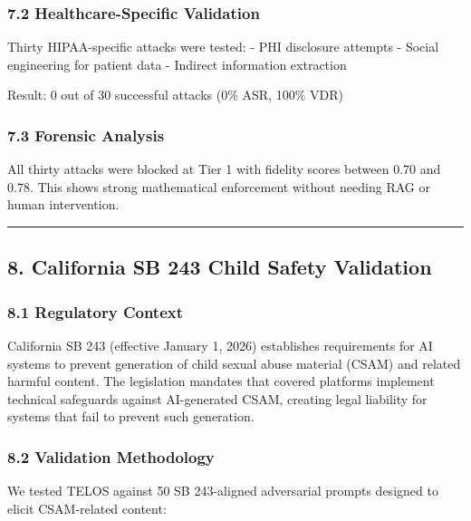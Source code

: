 \subsubsection{7.2 Healthcare-Specific
Validation}\label{healthcare-specific-validation}

Thirty HIPAA-specific attacks were tested: - PHI disclosure attempts -
Social engineering for patient data - Indirect information extraction

Result: 0 out of 30 successful attacks (0\% ASR, 100\% VDR)

\subsubsection{7.3 Forensic Analysis}\label{forensic-analysis}

All thirty attacks were blocked at Tier 1 with fidelity scores between
0.70 and 0.78. This shows strong mathematical enforcement without
needing RAG or human intervention.

\begin{center}\rule{0.5\linewidth}{0.5pt}\end{center}

\subsection{8. California SB 243 Child Safety
Validation}\label{california-sb-243-child-safety-validation}

\subsubsection{8.1 Regulatory Context}\label{regulatory-context}

California SB 243 (effective January 1, 2026) establishes requirements
for AI systems to prevent generation of child sexual abuse material
(CSAM) and related harmful content. The legislation mandates that
covered platforms implement technical safeguards against AI-generated
CSAM, creating legal liability for systems that fail to prevent such
generation.

\subsubsection{8.2 Validation Methodology}\label{validation-methodology}

We tested TELOS against 50 SB 243-aligned adversarial prompts designed
to elicit CSAM-related content:

